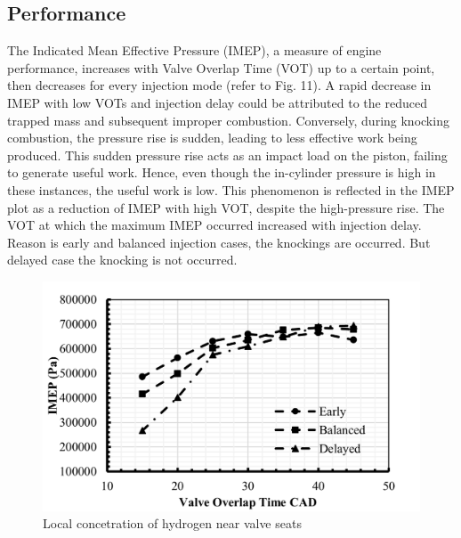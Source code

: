 \documentclass[conference]{IEEEtran}
\begin{document}
\subsection{Performance}
The Indicated Mean Effective Pressure (IMEP), a measure of engine performance, increases with Valve Overlap Time (VOT) up to a certain point, then decreases for every injection mode (refer to Fig. 11). A rapid decrease in IMEP with low VOTs and injection delay could be attributed to the reduced trapped mass and subsequent improper combustion. Conversely, during knocking combustion, the pressure rise is sudden, leading to less effective work being produced. This sudden pressure rise acts as an impact load on the piston, failing to generate useful work. Hence, even though the in-cylinder pressure is high in these instances, the useful work is low. This phenomenon is reflected in the IMEP plot as a reduction of IMEP with high VOT, despite the high-pressure rise. The VOT at which the maximum IMEP occurred increased with injection delay. Reason is early and balanced injection cases, the knockings are occurred. But delayed case the knocking is not occurred.

\begin{figure}[htbp]
    \centerline{\includegraphics{plots and graphs/11.png}}
    \caption{Local concetration of hydrogen near valve seats}
    \label{plt_11}
    \end{figure}
\end{document}
